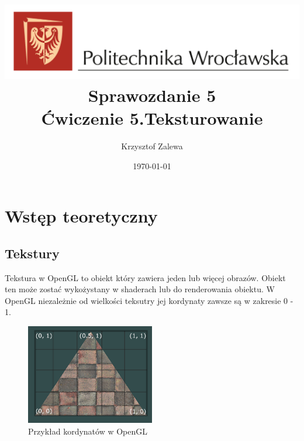 \documentclass{article}
\title{
  \centering
  \includegraphics[width=\textwidth]{images/logo_PWr_kolor_poziom.png}\\
  \fontsize{28pt}{30pt}\selectfont Sprawozdanie 5\\
  \fontsize{14pt}{30pt}\selectfont Ćwiczenie 5.Teksturowanie}
\author{Krzysztof Zalewa}
\date{\daymonthyear\today}
\begin{document}
    \maketitle
    \pagebreak
    \tableofcontents
    \FloatBarrier
    \section{Wstęp teoretyczny}
        \subsection{Tekstury}
            Tekstura w OpenGL to obiekt który zawiera jeden lub więcej obrazów. Obiekt ten może zostać wykożystany
            w shaderach lub do renderowania obiektu. W OpenGL niezależnie od wielkości teksutry jej kordynaty 
            zawsze są w zakresie 0 - 1.
            \begin{figure}[ht]
                \centering
                \includegraphics[width=0.5\textwidth]{images/tex_coords.png}
                \caption{Przykład kordynatów w OpenGL}
                \label{fig:coords}
            \end{figure}
            \pagebreak
\end{document}

